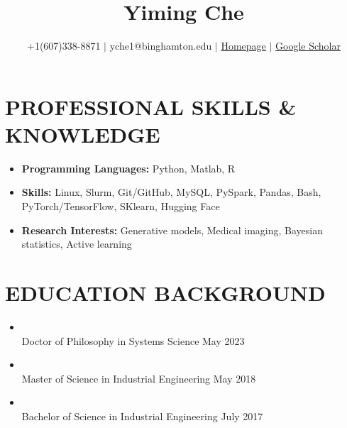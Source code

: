\documentclass[10pt]{article}
\title{\bf  Yiming Che \vspace{-0.4em}}
\author{+1(607)338-8871 $\vert$ yche1@binghamton.edu $\vert$ \href{https://soloche.github.io}{Homepage} $\vert$ \href{https://scholar.google.com/citations?user=HFI1L0QAAAAJ}{Google Scholar}}
\date{}
\begin{document}
	\maketitle

\vspace{-5em}
\section*{PROFESSIONAL SKILLS \& KNOWLEDGE}
\vspace{-0.5em}
 \begin{itemize}
	\setlength\itemsep{0.5pt}
 	\item {\bf Programming Languages:} Python, Matlab, R
 	\item {\bf Skills:} Linux, Slurm, Git/GitHub, MySQL, PySpark, Pandas, Bash, PyTorch/TensorFlow, SKlearn, Hugging Face
 	\item {\bf Research Interests:} Generative models, Medical imaging, Bayesian statistics, Active learning
 \end{itemize}

\vspace{-1.5em}
\section*{EDUCATION BACKGROUND}
\vspace{-0.5em}
\begin{itemize}
	\setlength\itemsep{0.5pt}

	\item {}                                                           
	\\Doctor of Philosophy in Systems Science \hfill May 2023 

	\item {}                                                           
	\\Master of Science in Industrial Engineering \hfill  May 2018

    \item {}
    \\Bachelor of Science in Industrial Engineering \hfill July 2017 
\end{itemize}
\end{document}
